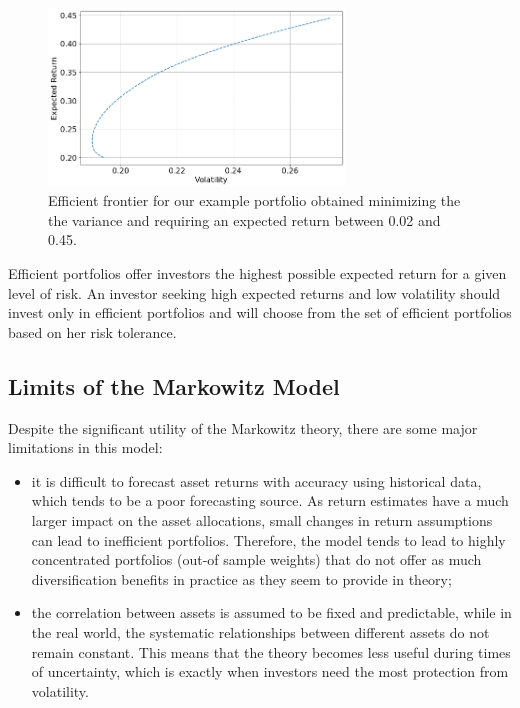 \begin{figure}[htb]
\centering
\includegraphics[width=0.7\textwidth]{figures/efficient_frontier}
\caption{Efficient frontier for our example portfolio obtained minimizing the the variance and requiring an expected return between 0.02 and 0.45.}
\label{fig:efficient_frontier}
\end{figure}

Efficient portfolios offer investors the highest possible expected return for a given level of risk. 
An investor seeking high expected returns and low volatility should invest only in efficient portfolios and will choose from the set of efficient portfolios based on her risk tolerance.
    
\subsection{Limits of the Markowitz Model}
\label{limits-of-the-markowitz-model}
    
Despite the significant utility of the Markowitz theory, there are some major limitations in this model:
    
\begin{itemize}
  	\tightlist
   	\item
   	it is difficult to forecast asset returns with accuracy using
   	historical data, which tends to be a poor forecasting source. As
   	return estimates have a much larger impact on the asset allocations,
   	small changes in return assumptions can lead to inefficient
   	portfolios. Therefore, the model tends to lead to highly concentrated
   	portfolios (out-of sample weights) that do not offer as much
   	diversification benefits in practice as they seem to provide in
   	theory;
   	\item
    the correlation between assets is assumed to be fixed and predictable, while
    in the real world, the systematic relationships between different assets 
    do not remain constant. This means that the theory becomes less useful during 
    times of uncertainty, which is exactly when investors need the most protection 
    from volatility.
    \end{itemize}
    
